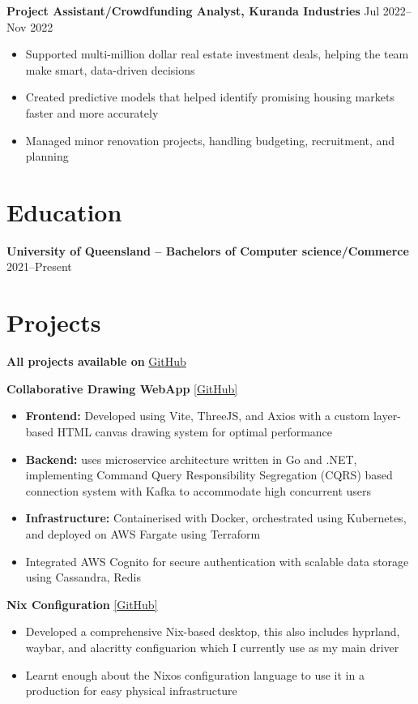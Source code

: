 \documentclass[10pt,a4paper]{article}
\begin{document}
	\textbf{Project Assistant/Crowdfunding Analyst, Kuranda Industries} \hfill Jul 2022--Nov 2022 
	\begin{itemize}[label=\textbullet, itemsep=0.05cm]
		\item Supported multi-million dollar real estate investment deals, helping the team make smart, data-driven decisions
		\item Created predictive models that helped identify promising housing markets faster and more accurately
		\item Managed minor renovation projects, handling budgeting, recruitment, and planning
	\end{itemize}
	
	\section{Education}
	\textbf{University of Queensland -- Bachelors of Computer science/Commerce} \hfill 2021--Present \\	
	\section{Projects}
	\textbf{All projects available on} \href{https://github.com/CameronBadman}{GitHub}
	
	\textbf{Collaborative Drawing WebApp} \href{https://github.com/CameronBadman/Canvis-collab-webapp}{[GitHub]}
	\begin{itemize}[label=\textbullet, itemsep=0.05cm]
		\item \textbf{Frontend:} Developed using Vite, ThreeJS, and Axios with a custom layer-based HTML canvas drawing system for optimal performance
		\item \textbf{Backend:} uses microservice architecture written in Go and .NET, implementing Command Query Responsibility Segregation (CQRS) based connection system with Kafka to accommodate high concurrent users
		\item \textbf{Infrastructure:} Containerised with Docker, orchestrated using Kubernetes, and deployed on AWS Fargate using Terraform
		\item Integrated AWS Cognito for secure authentication with scalable data storage using Cassandra, Redis
	\end{itemize}
	
	\textbf{Nix Configuration} \href{https://github.com/CameronBadman/nvim-config}{[GitHub]}
	\begin{itemize}[label=\textbullet, itemsep=0.05cm]
		\item Developed a comprehensive Nix-based desktop, this also includes hyprland, waybar, and alacritty configuarion which I currently use as my main driver
		\item Learnt enough about the Nixos configuration language to use it in a production for easy physical infrastructure
	\end{itemize}
	
\end{document}
